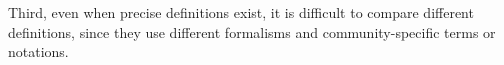 \documentclass[journal,compsoc]{IEEEtran}
\begin{document}
 Third, even when precise definitions exist, it is difficult to compare different definitions, since they use different formalisms and community-specific terms or notations.
\end{document}
